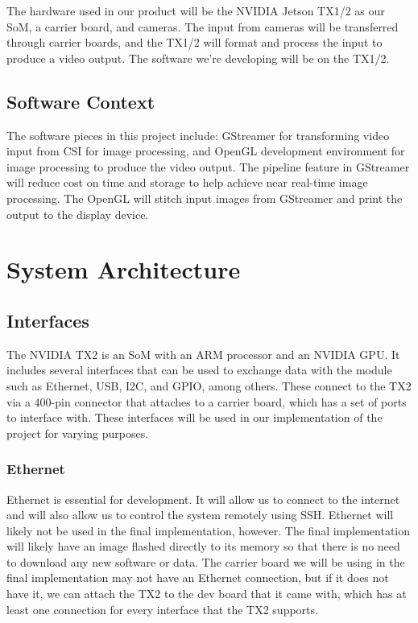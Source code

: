 \documentclass[letterpaper,10pt,serif,draftclsnofoot,onecolumn,compsoc,titlepage]{IEEEtran}
\begin{document}
The hardware used in our product will be the NVIDIA Jetson TX1/2 as our SoM, 
a carrier board, and cameras. The input from cameras will be transferred through 
carrier boards, and the TX1/2 will format and process the input to produce a 
video output. The software we're developing will be on the TX1/2. \\

\subsection{Software Context}

The software pieces in this project include: GStreamer for transforming video input 
from CSI for image processing, and OpenGL development environment for image processing 
to produce the video output. The pipeline feature in GStreamer will reduce 
cost on time and storage to help achieve near real-time image processing. The OpenGL 
will stitch input images from GStreamer and print the output to the display device. \\

\section{System Architecture}

\subsection{Interfaces}

The NVIDIA TX2 is an SoM with an ARM processor and an NVIDIA GPU. It includes several 
interfaces that can be used to exchange data with the module such as Ethernet, USB, 
I2C, and GPIO, among others. These connect to the TX2 via a 400-pin connector that 
attaches to a carrier board, which has a set of ports to interface with. These 
interfaces will be used in our implementation of the project for varying purposes. \\

\subsubsection{Ethernet}

Ethernet is essential for development. It will allow us to connect to the internet and 
will also allow us to control the system remotely using SSH. Ethernet will likely not 
be used in the final implementation, however. The final implementation will likely 
have an image flashed directly to its memory so that there is no need to download any 
new software or data. The carrier board we will be using in the final implementation 
may not have an Ethernet connection, but if it does not have it, we can attach the TX2 
to the dev board that it came with, which has at least one connection for every 
interface that the TX2 supports. \\
\end{document}
